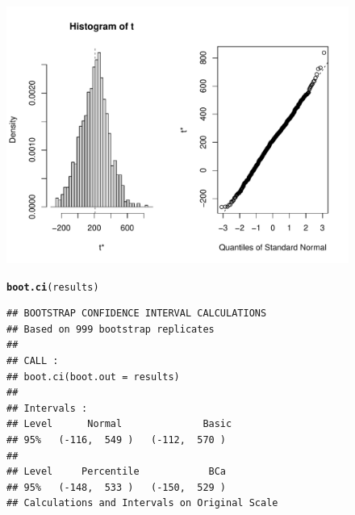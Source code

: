\documentclass[10pt]{beamer}\usepackage[]{graphicx}\usepackage[]{color}
\makeatletter
\def\maxwidth{ %
  \ifdim\Gin@nat@width>\linewidth
    \linewidth
  \else
    \Gin@nat@width
  \fi
}
\newcommand{\hlstd}[1]{\textcolor[rgb]{0.345,0.345,0.345}{#1}}%
\newcommand{\hlkwd}[1]{\textcolor[rgb]{0.737,0.353,0.396}{\textbf{#1}}}%
\newenvironment{kframe}{%
 \def\at@end@of@kframe{}%
 \ifinner\ifhmode%
  \def\at@end@of@kframe{\end{minipage}}%
  \begin{minipage}{\columnwidth}%
 \fi\fi%
 \def\FrameCommand##1{\hskip\@totalleftmargin \hskip-\fboxsep
 \colorbox{shadecolor}{##1}\hskip-\fboxsep
     \hskip-\linewidth \hskip-\@totalleftmargin \hskip\columnwidth}%
 \MakeFramed {\advance\hsize-\width
   \@totalleftmargin\z@ \linewidth\hsize
   \@setminipage}}%
 {\par\unskip\endMakeFramed%
 \at@end@of@kframe}
\newenvironment{knitrout}{}{} %
\makeatother
\begin{document}
\begin{frame}
\begin{figure}
\begin{minipage}[h]{0.50\linewidth}
\begin{knitrout}
{\centering \includegraphics[width=\maxwidth]{figure/unnamed-chunk-27-1} 

}


\begin{kframe}\begin{alltt}
\hlkwd{boot.ci}\hlstd{(results)}
\end{alltt}
\begin{verbatim}
## BOOTSTRAP CONFIDENCE INTERVAL CALCULATIONS
## Based on 999 bootstrap replicates
## 
## CALL : 
## boot.ci(boot.out = results)
## 
## Intervals : 
## Level      Normal              Basic         
## 95%   (-116,  549 )   (-112,  570 )  
## 
## Level     Percentile            BCa          
## 95%   (-148,  533 )   (-150,  529 )  
## Calculations and Intervals on Original Scale
\end{verbatim}
\end{kframe}
\end{knitrout}
		\end{minipage}
	\end{figure}
\end{frame}
\end{document}
